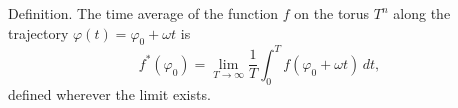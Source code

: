 Definition. The time average of the function $f$ on the torus $T^n$ along the trajectory $\varphi(t) = \varphi_0 + \omega t$ is
$$f^*(\varphi_0) = \lim_{T \to \infty} \frac{1}{T} \int_{0}^{T} f(\varphi_0 + \omega t) \, dt,$$
defined wherever the limit exists.

